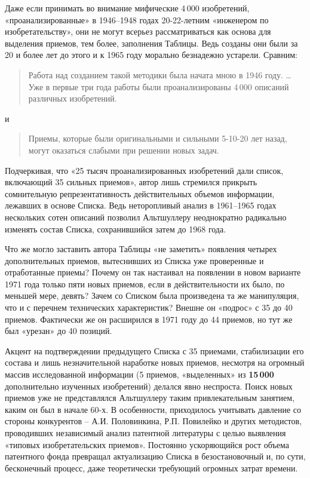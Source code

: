 \documentclass[11pt,a4paper]{article}
\begin{document}
Даже если принимать во внимание мифические 4\,000 изобретений,
«проанализированные» в 1946--1948 годах 20-22-летним «инженером по
изобретательству», они не могут всерьез рассматриваться как основа для
выделения приемов, тем более, заполнения Таблицы. Ведь созданы они были за 20
и более лет до этого и к 1965 году морально безнадежно устарели. Сравним:
\begin{quote}
  Работа над созданием такой методики была начата мною в 1946 году. … Уже в
  первые три года работы были проанализированы 4\,000 описаний различных
  изобретений.  \cite{Altshuller1961}
\end{quote}
и
\begin{quote}
  Приемы, которые были оригинальными и сильными 5-10-20 лет назад, могут
  оказаться слабыми при решении новых задач.  \cite[стр. 139]{Altshuller1973}
\end{quote}
Подчеркивая, что «25 тысяч проанализированных изобретений дали список,
включающий 35 сильных приемов», автор лишь стремился прикрыть сомнительную
репрезентативность действительных объемов информации, лежавших в основе
Списка. Ведь неторопливый анализ в 1961--1965 годах нескольких сотен описаний
позволил Альтшуллеру неоднократно радикально изменять состав Списка,
сохранившийся затем до 1968 года.

Что же могло заставить автора Таблицы «не заметить» появления четырех
дополнительных приемов, вытеснивших из Списка уже проверенные и отработанные
приемы? Почему он так настаивал на появлении в новом варианте 1971 года только
пяти новых приемов, если в действительности их было, по меньшей мере, девять?
Зачем со Списком была произведена та же манипуляция, что и с перечнем
технических характеристик? Внешне он «подрос» с 35 до 40 приемов. Фактически
же он расширился в 1971 году до 44 приемов, но тут же был «урезан» до 40
позиций.

Акцент на подтверждении предыдущего Списка с 35 приемами, стабилизации его
состава и лишь незначительной наработке новых приемов, несмотря на огромный
массив исследованной информации (5 приемов, «выделенных» из \textbf{15\,000}
дополнительно изученных изобретений) делался явно неспроста. Поиск новых
приемов уже не представлялся Альтшуллеру таким привлекательным занятием, каким
он был в начале 60-х. В особенности, приходилось учитывать давление со стороны
конкурентов -- А.И. Половинкина, Р.П. Повилейко и других методистов,
проводивших независимый анализ патентной литературы с целью выявления «типовых
изобретательских приемов». Постоянно ускоряющийся рост объема патентного фонда
превращал актуализацию Списка в безостановочный и, по сути, бесконечный
процесс, даже теоретически требующий огромных затрат времени.
\end{document}
